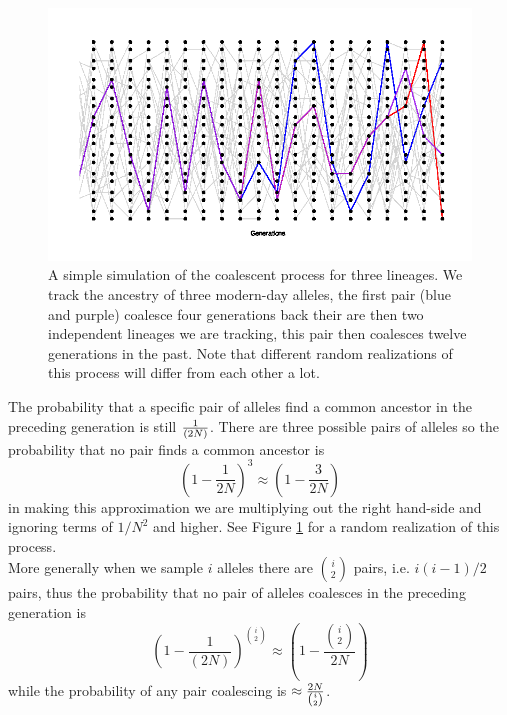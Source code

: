 \begin{figure}
\begin{center}
  \includegraphics[width = \textwidth]{figures/Coalescent_3.png}
\end{center}
\caption{A simple simulation of the coalescent process for three
  lineages. We track the ancestry of 
  three modern-day alleles, the first pair (blue and purple) coalesce four generations back 
  their are then two independent lineages we are tracking, this pair
  then coalesces twelve generations in the past. Note that different
  random realizations of this process will differ from each other a lot.} \label{fig:Coalescent_simulation_3}
\end{figure}

The probability that a specific pair of alleles find a common ancestor in the
preceding generation is still $\nicefrac{1}{(2N)}$. There are three possible pairs of
alleles so the probability that no pair finds a common ancestor is
\begin{equation}
\left(1-\frac{1}{2N} \right)^3 \approx \left( 1- \frac{3}{2N} \right)
\end{equation}
in making this approximation we are multiplying out the right hand-side
and ignoring terms of $1/N^2$ and higher. See
Figure \ref{fig:Coalescent_simulation_3} for a random realization of this process. \\

More generally when we sample $i$ alleles there are ${i \choose 2}$
pairs,  i.e. $i(i-1)/2$ pairs, thus the probability that no pair
of alleles coalesces in the preceding generation is
\begin{equation}
\left(1-\frac{1}{(2N)} \right)^{{i \choose
 2}} \approx \left( 1- \frac{{i \choose
 2}}{2N}\right)
\end{equation}
while the probability of any pair coalescing is $\approx \nicefrac{2N}{{i \choose
 2}}$.\\

